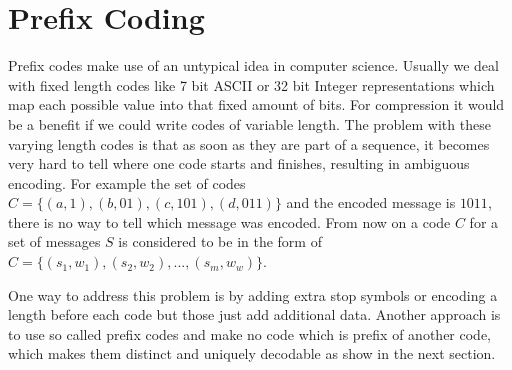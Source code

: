 \section{Prefix Coding}
\label{ch:Principles of compression:sec:Huffman Coding}
\par{
Prefix codes make use of an untypical idea in computer science. Usually we deal with fixed length codes like 7 bit ASCII or 32 bit Integer representations which map each possible value into that fixed amount of bits. For compression it would be a benefit if we could write codes of variable length. The problem with these varying length codes is that as soon as they are part of a sequence, it becomes very hard to tell where one code starts and finishes, resulting in ambiguous encoding. For example the set of codes $ C= \{(a,1),(b,01),(c,101),(d,011)\}$ and the encoded message is $1011$, there is no way to tell which message was encoded. From now on a code $C$ for a set of messages $S$ is considered to be in the form of $ C= \{(s_1,w_1),(s_2,w_2),...,(s_m,w_w)\}$.
}
\par{
One way to address this problem is by adding extra stop symbols or encoding a length before each code but those just add additional data. Another approach is to use so called prefix codes and make no code which is prefix of another code, which makes them distinct and uniquely decodable as show in the next section.
}

